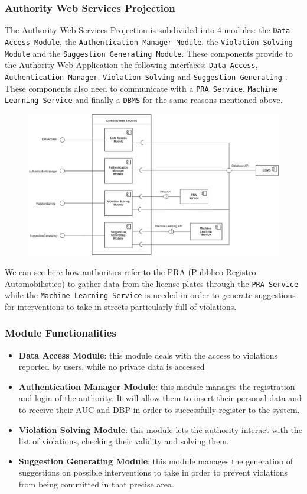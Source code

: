 \documentclass[12pt,a4paper]{article}
\begin{document}
\subsubsection{Authority Web Services Projection}
The Authority Web Services Projection is subdivided into 4 modules: the \texttt{Data Access Module}, the \texttt{Authentication Manager Module}, the \texttt{Violation Solving Module} and the \texttt{Suggestion Generating Module}. These components provide to the Authority Web Application the following interfaces: \texttt{Data Access}, \texttt{Authentication Manager}, \texttt{Violation Solving} and \texttt{Suggestion Generating} . These components also need to communicate with a \texttt{PRA Service}, \texttt{Machine Learning Service} and finally a \texttt{DBMS} for the same reasons mentioned above.
\begin{figure}[H]
		\centering
		\includegraphics[width=1.2\linewidth]{../assets/images/AUTH PROJECTION.png}
	\end{figure}
We can see here how authorities refer to the PRA (Pubblico Registro Automobilistico) to gather data from the license plates through the \texttt{PRA Service} while the \texttt{Machine Learning Service} is needed in order to generate suggestions for interventions to take in streets particularly full of violations.
\subsubsection*{Module Functionalities}
\begin{itemize}
\item \textbf{Data Access Module}: this module deals with the access to violations reported by users, while no private data is accessed 
\item \textbf{Authentication Manager Module}: this module manages the registration and login of the authority. It will allow them to insert their personal data and to receive their AUC and DBP in order to successfully register to the system.
\item \textbf{Violation Solving Module}: this module lets the authority interact with the list of violations, checking their validity and solving them. 
\item \textbf{Suggestion Generating Module}: this module manages the generation of suggestions on possible interventions to take in order to prevent violations from being committed in that precise area.
\end{itemize}
\newpage
\end{document}
